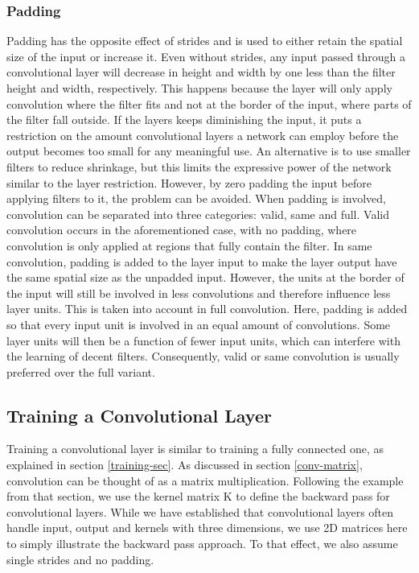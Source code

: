 \subsubsection{Padding}

Padding has the opposite effect of strides and is used to either retain the spatial size of the input or increase it. Even without strides, any input passed through a convolutional layer will decrease in height and width by one less than the filter height and width, respectively. This happens because the layer will only apply convolution where the filter fits and not at the border of the input, where parts of the filter fall outside. If the layers keeps diminishing the input, it puts a restriction on the amount convolutional layers a network can employ before the output becomes too small for any meaningful use. An alternative is to use smaller filters to reduce shrinkage, but this limits the expressive power of the network similar to the layer restriction. However, by zero padding the input before applying filters to it, the problem can be avoided. When padding is involved, convolution can be separated into three categories: valid, same and full. Valid convolution occurs in the aforementioned case, with no padding, where convolution is only applied at regions that fully contain the filter. In same convolution, padding is added to the layer input to make the layer output have the same spatial size as the unpadded input. However, the units at the border of the input will still be involved in less convolutions and therefore influence less layer units. This is taken into account in full convolution. Here, padding is added so that every input unit is involved in an equal amount of convolutions. Some layer units will then be a function of fewer input units, which can interfere with the learning of decent filters. Consequently, valid or same convolution is usually preferred over the full variant.

\subsection{Training a Convolutional Layer}

Training a convolutional layer is similar to training a fully connected one, as explained in section \ref{training-sec}. As discussed in section \ref{conv-matrix}, convolution can be thought of as a matrix multiplication. Following the example from that section, we use the kernel matrix K to define the backward pass for convolutional layers. While we have established that convolutional layers often handle input, output and kernels with three dimensions, we use 2D matrices here to simply illustrate the backward pass approach. To that effect, we also assume single strides and no padding. 

